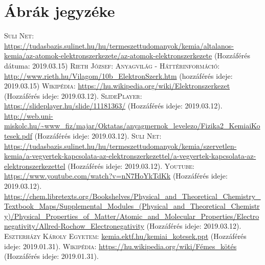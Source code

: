 \documentclass[colorlinks]{thesis-ekf}
\theoremstyle{definition}
\theoremstyle{remark}
\begin{document}
\chapter{Ábrák jegyzéke}
\begin{thebibliography}{1}
	 \textsc{Suli Net}: \url{https://tudasbazis.sulinet.hu/hu/termeszettudomanyok/kemia/altalanos-kemia/az-atomok-elektronszerkezete/az-atomok-elektronszerkezete} (Hozzáférés dátuma: 2019.03.15)
	  \textsc{Rieth József: Anyagvilág - Háttérinformáció}: \url{http://www.rieth.hu/Vilagom/10b_ElektronSzerk.htm} (hozzáférés ideje: 2019.03.15)
	 \textsc{Wikipédia}: \url{https://hu.wikipedia.org/wiki/Elektronszerkezet} (Hozzáférés ideje: 2019.03.12).
	 \textsc{SlidePlayer}: \url{https://slideplayer.hu/slide/11181363/} (Hozzáférés ideje: 2019.03.12).
	 \url{http://web.uni-miskolc.hu/~www_fiz/majar/Oktatas/anyagmernok_levelezo/Fizika2_KemiaiKotesek.pdf} (Hozzáférés ideje: 2019.03.12).
	 \textsc{Suli Net}: \url{https://tudasbazis.sulinet.hu/hu/termeszettudomanyok/kemia/szervetlen-kemia/a-vegyertek-kapcsolata-az-elektronszerkezettel/a-vegyertek-kapcsolata-az-elektronszerkezettel} (Hozzáférés ideje: 2019.03.12).
	 \textsc{Youtube}: \url{https://www.youtube.com/watch?v=nN7HoYkTdKk} (Hozzáférés ideje: 2019.03.12).
	 \url{https://chem.libretexts.org/Bookshelves/Physical_and_Theoretical_Chemistry_Textbook_Maps/Supplemental_Modules_(Physical_and_Theoretical_Chemistry)/Physical_Properties_of_Matter/Atomic_and_Molecular_Properties/Electronegativity/Allred-Rochow_Electronegativity} (Hozzáférés ideje: 2019.03.12).
	 \textsc{Eszterházy Károly Egyetem}: \url{kemia.ektf.hu/kemiai_kotesek.ppt} (Hozzáférés ideje: 2019.01.31).
	 \textsc{Wikipédia}: \url{https://hu.wikipedia.org/wiki/Fémes_kötés} (Hozzáférés ideje: 2019.01.31).
\end{thebibliography}
\end{document}
